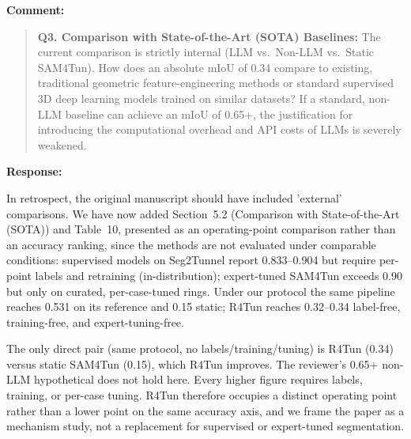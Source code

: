 \documentclass[11pt,a4paper]{article}
\newcommand{\MSSOTATable}{Table~10}
\newenvironment{commentblock}{%
  \par\smallskip\noindent\textbf{Comment:}\par
  \begin{quote}\itshape\color{black}
}{%
  \end{quote}\smallskip
}
\newenvironment{responseblock}{%
  \par\smallskip\noindent\textbf{Response:}\par
  \begingroup\color{responsegreen}
}{%
  \endgroup\smallskip
}
\begin{document}
\begin{commentblock}
\textbf{Q3. Comparison with State-of-the-Art (SOTA) Baselines:} The current comparison is strictly internal (LLM vs.\ Non-LLM vs.\ Static SAM4Tun). How does an absolute mIoU of 0.34 compare to existing, traditional geometric feature-engineering methods or standard supervised 3D deep learning models trained on similar datasets? If a standard, non-LLM baseline can achieve an mIoU of 0.65+, the justification for introducing the computational overhead and API costs of LLMs is severely weakened.
\end{commentblock}
\begin{responseblock}
In retrospect, the original manuscript should have included 'external' comparisons. We have now added Section~5.2 (Comparison with State-of-the-Art (SOTA)) and \MSSOTATable, presented as an operating-point comparison rather than an accuracy ranking, since the methods are not evaluated under comparable conditions: supervised models on Seg2Tunnel report 0.833--0.904 but require per-point labels and retraining (in-distribution); expert-tuned SAM4Tun exceeds 0.90 but only on curated, per-case-tuned rings. Under our protocol the same pipeline reaches 0.531 on its reference and 0.15 static; R4Tun reaches 0.32--0.34 label-free, training-free, and expert-tuning-free. 

The only direct pair (same protocol, no labels/training/tuning) is R4Tun (0.34) versus static SAM4Tun (0.15), which R4Tun improves. The reviewer's 0.65+ non-LLM hypothetical does not hold here. Every higher figure requires labels, training, or per-case tuning. R4Tun therefore occupies a distinct operating point rather than a lower point on the same accuracy axis, and we frame the paper as a mechanism study, not a replacement for supervised or expert-tuned segmentation.


\end{responseblock}
\end{document}
